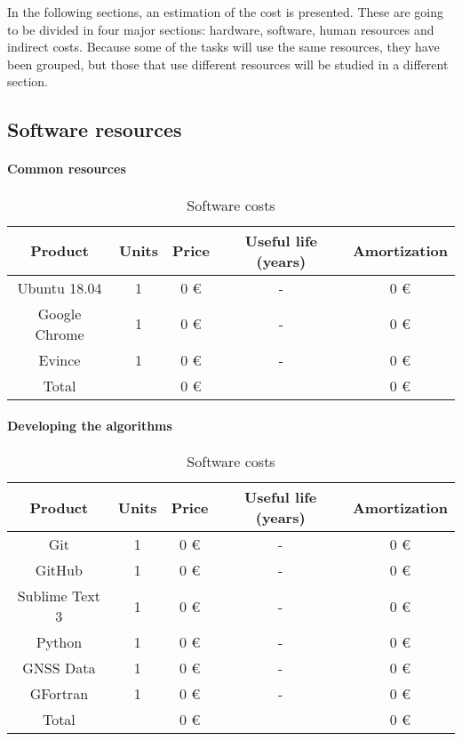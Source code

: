 In the following sections, an estimation of the cost is presented. These are going to be divided in four major sections: hardware, software, human resources and indirect costs. Because  some of the tasks will use the same resources, they have been grouped, but those that use different resources will be studied in a different section.

\subsection{Software resources}

\paragraph{Common resources}

\begin{table}[h!]
	\centering
	\def\arraystretch{1.2}
	\begin{tabular}{|c c c c c|} 
		\hline
		Product & Units & Price & Useful life (years) & Amortization \\ [0.5ex] 
		\hline\hline
		Ubuntu 18.04 & 1 & 0 \euro & - & 0 \euro \\ 
		\hline
		Google Chrome & 1 & 0 \euro & - & 0 \euro \\
		\hline
		Evince & 1 & 0 \euro & - & 0 \euro \\
		\hline\hline
		Total &  & 0 \euro &  & 0 \euro \\
		\hline
	\end{tabular}
	\caption{Software costs}
\end{table}

\newpage

\paragraph{Developing the algorithms}

\begin{table}[h!]
	\centering
	\def\arraystretch{1.2}
	\begin{tabular}{|c c c c c|} 
		\hline
		Product & Units & Price & Useful life (years) & Amortization \\
		\hline\hline
		Git & 1 & 0 \euro & - & 0 \euro \\ 
		\hline
		GitHub & 1 & 0 \euro & - & 0 \euro \\
		\hline
		Sublime Text 3 & 1 & 0 \euro & - & 0 \euro \\
		\hline
		Python & 1 & 0 \euro & - & 0 \euro \\
		\hline
		GNSS Data & 1 & 0 \euro & - & 0 \euro \\
		\hline
		GFortran & 1 & 0 \euro & - & 0 \euro \\
		\hline\hline
		Total &   & 0 \euro &  & 0 \euro \\
		\hline
	\end{tabular}
	\caption{Software costs}
\end{table}

